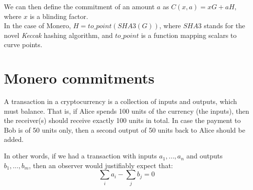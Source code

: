 We can then define the commitment of an amount \(a\) as \(C(x, a) = x G + a H\), where \(x\) is a blinding factor. 
\\

In the case of Monero, \(H = to\_point(\mathit{SHA3}(G))\), where \(\mathit{SHA3}\) stands for the novel {\em Keccak} hashing algorithm, and \(to\_point\) is a function mapping scalars to curve points.  



%
%
%
%
%
%
\section{Monero commitments}
\label{sec:pedersen_monero}

A transaction in a cryptocurrency is a collection of inputs and outputs, which must balance. That is, if Alice spends 100 units of the currency (the inputs), then the receiver(s) should receive exactly 100 units in total. In case the payment to Bob is of 50 units only, then a second output of 50 units back to Alice should be added. 

In other words, if we had a transaction with inputs \(a_1, ..., a_n\) and outputs \(b_1, ..., b_m\), then an
observer would justifiably expect that: 
\[\sum_i a_i - \sum_j b_j = 0\]

